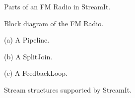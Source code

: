 \begin{figure}[t]
\begin{minipage}{3.3in}
\vspace{-12pt}
\vspace{-36pt}
\caption{Parts of an FM Radio in StreamIt.
\protect\label{fig:radiocode}}
\end{minipage}
\hspace{0.1in}
\begin{minipage}{3.1in}
\centering
{}
\caption{Block diagram of the FM Radio.
\protect\label{fig:radio-ascoded}}
\vspace{0.8in}
\vspace{10pt}

(a) A Pipeline. \\
\vspace{10pt}

(b) A SplitJoin. \\
\vspace{10pt}

(c) A FeedbackLoop. \\
\caption{Stream structures supported by StreamIt.
\protect\label{fig:structures}}
\end{minipage}
\end{figure}




  
